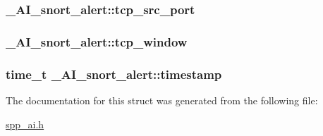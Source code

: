 \label{struct__AI__snort__alert_ad6edf59fccea55bf5f940bf36117020b}
\hypertarget{struct__AI__snort__alert_a4d4cbdbd9675f4c43545547f55174cb7}{
\subsubsection[{tcp\_\-src\_\-port}]{ {\bf \_\-AI\_\-snort\_\-alert::tcp\_\-src\_\-port}}}
\label{struct__AI__snort__alert_a4d4cbdbd9675f4c43545547f55174cb7}
\hypertarget{struct__AI__snort__alert_a1687fccc26bb211591db8b36ffec5348}{
\subsubsection[{tcp\_\-window}]{ {\bf \_\-AI\_\-snort\_\-alert::tcp\_\-window}}}
\label{struct__AI__snort__alert_a1687fccc26bb211591db8b36ffec5348}
\hypertarget{struct__AI__snort__alert_a10a67f60ca3da339a2104849a0b2ac19}{
\subsubsection[{timestamp}]{\setlength{\rightskip}{0pt plus 5cm}time\_\-t {\bf \_\-AI\_\-snort\_\-alert::timestamp}}}
\label{struct__AI__snort__alert_a10a67f60ca3da339a2104849a0b2ac19}


The documentation for this struct was generated from the following file:\begin{DoxyCompactItemize}
\item 
\hyperlink{spp__ai_8h}{spp\_\-ai.h}\end{DoxyCompactItemize}
